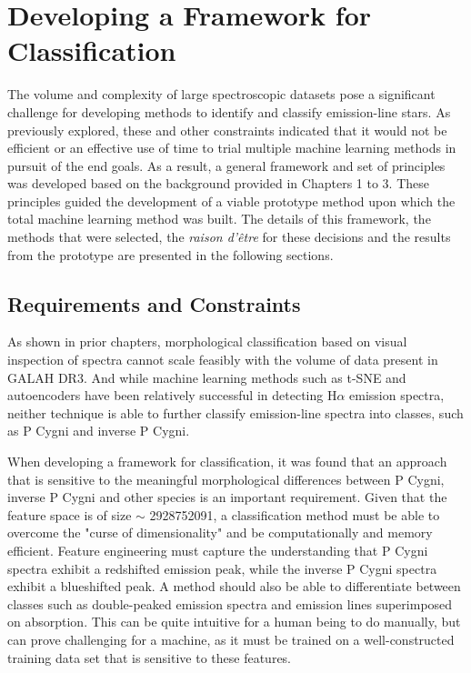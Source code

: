 \chapter{Developing a Framework for Classification}

The volume and complexity of large spectroscopic datasets pose a significant challenge for developing methods to identify and classify emission-line stars. As previously explored, these and other constraints indicated that it would not be efficient or an effective use of time to trial multiple machine learning methods in pursuit of the end goals. As a result, a general framework and set of principles was developed based on the background provided in Chapters 1 to 3. These principles guided the development of a viable prototype method upon which the total machine learning method was built. The details of this framework, the methods that were selected, the {\em raison d'être} for these decisions and the results from the prototype are presented in the following sections.

\section{Requirements and Constraints}

As shown in prior chapters, morphological classification based on visual inspection of spectra cannot scale feasibly with the volume of data present in GALAH DR3. And while machine learning methods such as t-SNE and autoencoders \citep{traven2017galah, vcotar2021galah} have been relatively successful in detecting H$\alpha$ emission spectra, neither technique is able to further classify emission-line spectra into classes, such as P Cygni and inverse P Cygni.

When developing a framework for classification, it was found that an approach that is sensitive to the meaningful morphological differences between P Cygni, inverse P Cygni and other species is an important requirement. Given that the feature space is of size $\sim$ \num[round-precision=2,round-mode=figures, scientific-notation=true]{2928752091}, a classification method must be able to overcome the "curse of dimensionality" and be computationally and memory efficient. Feature engineering must capture the understanding that P Cygni spectra exhibit a redshifted emission peak, while the inverse P Cygni spectra exhibit a blueshifted peak. A method should also be able to differentiate between classes such as double-peaked emission spectra and emission lines superimposed on absorption. This can be quite intuitive for a human being to do manually, but can prove challenging for a machine, as it must be trained on a well-constructed training data set that is sensitive to these features. 

